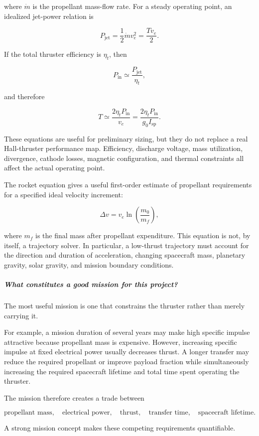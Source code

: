 where \(\dot{m}\) is the propellant mass-flow rate. For a steady
operating point, an idealized jet-power relation is

\[
	P_{\mathrm{jet}}
	= \frac{1}{2}\dot{m}v_e^2
	= \frac{T v_e}{2}.
\]

If the total thruster efficiency is \(\eta_t\), then

\[
	P_{\mathrm{in}}
	\simeq \frac{P_{\mathrm{jet}}}{\eta_t},
\]

and therefore

\[
	T \simeq \frac{2\eta_t P_{\mathrm{in}}}{v_e}
	= \frac{2\eta_t P_{\mathrm{in}}}
	{g_0 I_{\mathrm{sp}}}.
\]

These equations are useful for preliminary sizing, but they do not
replace a real Hall-thruster performance map. Efficiency, discharge
voltage, mass utilization, divergence, cathode losses, magnetic
configuration, and thermal constraints all affect the actual
operating point.

The rocket equation gives a useful first-order estimate of
propellant requirements for a specified ideal velocity increment:

\[
	\Delta v
	= v_e \ln\left(\frac{m_0}{m_f}\right),
\]

where \(m_f\) is the final mass after propellant expenditure. This
equation is not, by itself, a trajectory solver. In particular, a
low-thrust trajectory must account for the direction and duration of
acceleration, changing spacecraft mass, planetary gravity, solar
gravity, and mission boundary conditions.

\subparagraph{What constitutes a good mission for this project?}

The most useful mission is one that constrains the thruster rather
than merely carrying it.

For example, a mission duration of several years may make high
specific impulse attractive because propellant mass is expensive.
However, increasing specific impulse at fixed electrical power
usually decreases thrust. A longer transfer may reduce the required
propellant or improve payload fraction while simultaneously increasing
the required spacecraft lifetime and total time spent operating the
thruster.

The mission therefore creates a trade between

\[
	\text{propellant mass},\quad
	\text{electrical power},\quad
	\text{thrust},\quad
	\text{transfer time},\quad
	\text{spacecraft lifetime}.
\]

A strong mission concept makes these competing requirements
quantifiable.

